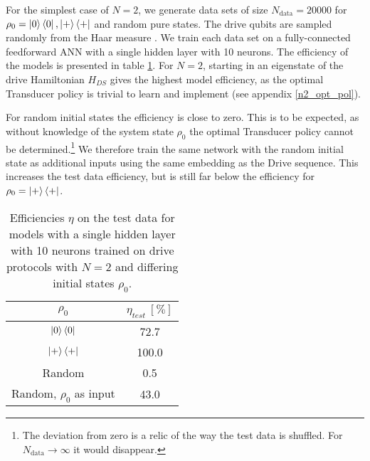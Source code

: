 For the simplest case of $N = 2$, we generate data sets of size $N_{\mathrm{data}} = 20000$ for $\rho_0 = \ket{0} \bra{0}, \ket{+} \bra{+}$ and random pure states.
The drive qubits are sampled randomly from the Haar measure \cite{Mezzadri}.
We train each data set on a fully-connected feedforward ANN with a single hidden layer with 10 neurons.
The efficiency of the models is presented in table \ref{n2efftable}.
For $N = 2$, starting in an eigenstate of the drive Hamiltonian $H_{DS}$ gives the highest model efficiency, as the optimal Transducer policy is trivial to learn and implement (see appendix \ref{n2_opt_pol}).

For random initial states the efficiency is close to zero.
This is to be expected, as without knowledge of the system state $\rho_0$ the optimal Transducer policy cannot be determined.\footnote{The deviation from zero is a relic of the way the test data is shuffled. For $N_{\mathrm{data}} \to \infty$ it would disappear.}
We therefore train the same network with the random initial state as additional inputs using the same embedding as the Drive sequence.
This increases the test data efficiency, but is still far below the efficiency for $\rho_0 = \ket{+} \bra{+}$.


\begin{table}[h]
	\centering
	\begin{tabular}{ c | c }
		$\rho_0$ & $\eta_{test} \ [\%]$ \\
		\hline
		$\ket{0} \bra{0}$ & 72.7 \\
		$\ket{+} \bra{+}$ & 100.0 \\
		Random & 0.5 \\
		Random, $\rho_0$ as input & 43.0 \\
	\end{tabular}
	\caption{Efficiencies $\eta$ on the test data for models with a single hidden layer with 10 neurons trained on drive protocols with $N = 2$ and differing initial states $\rho_0$.}
	\label{n2efftable}
\end{table}


